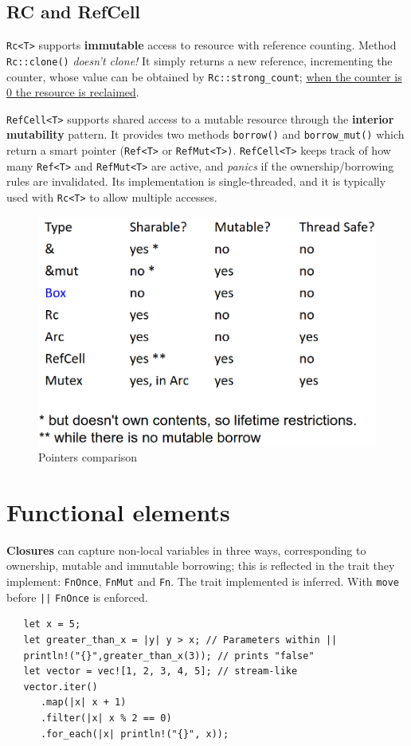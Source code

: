 \subsection{RC and RefCell}
\lstinline|Rc<T>| supports \textbf{immutable} access to resource with
reference counting.
Method \lstinline|Rc::clone()| \emph{doesn't clone!}
It simply returns a new reference, incrementing the counter,
whose value can be obtained by \lstinline|Rc::strong_count|;
\ul{when the counter is 0 the resource is reclaimed}.


\lstinline|RefCell<T>| supports shared access to a mutable
resource through the \textbf{interior mutability} pattern.
It provides two methods \lstinline|borrow()| and \lstinline|borrow_mut()| which
return a smart pointer (\lstinline|Ref<T>| or \lstinline|RefMut<T>)|.
\lstinline|RefCell<T>| keeps track of how many \lstinline|Ref<T>| and
\lstinline|RefMut<T>| are active, and \textit{panics} if the
ownership/borrowing rules are invalidated.
Its implementation is single-threaded, and it is typically used with \lstinline|Rc<T>| to allow multiple accesses.

\begin{figure}[htbp]
   \centering
   \includegraphics{images/smartpointers.png}
   \caption{Pointers comparison}
   \label{fig:smartpointers}
\end{figure}

\newpage
\section{Functional elements}

\textbf{Closures} can capture non-local variables in three ways,
corresponding to ownership, mutable and immutable
borrowing; 
this is reflected in the trait they implement: \lstinline|FnOnce|,
\lstinline|FnMut| and \lstinline|Fn|.
The trait implemented is inferred.
With \lstinline|move| before \lstinline{||} \lstinline|FnOnce| is enforced.
\begin{lstlisting}
   let x = 5;
   let greater_than_x = |y| y > x; // Parameters within ||
   println!("{}",greater_than_x(3)); // prints "false"
   let vector = vec![1, 2, 3, 4, 5]; // stream-like
   vector.iter()
      .map(|x| x + 1)
      .filter(|x| x % 2 == 0)
      .for_each(|x| println!("{}", x));
\end{lstlisting}

